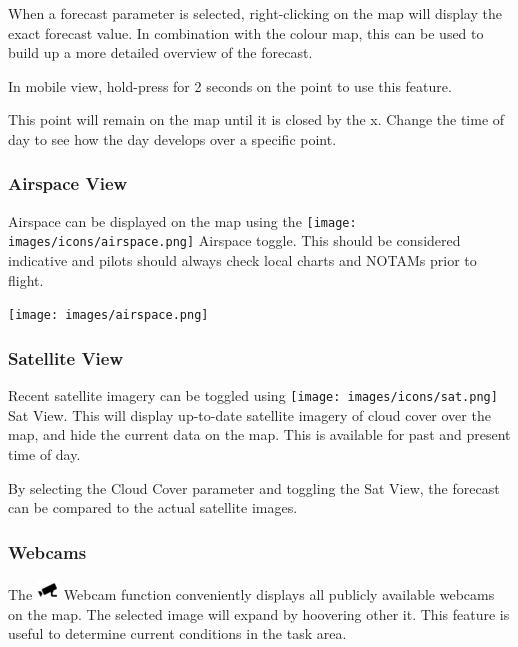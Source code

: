 \documentclass[11pt,a4paper]{article}
\begin{document}
When a forecast parameter is selected, right-clicking on the map will display the exact forecast value. In combination with the colour map, this can be used to build up a more detailed overview of the forecast.

In mobile view, hold-press for 2 seconds on the point to use this feature.

\begin{tip}
\item This point will remain on the map until it is closed by the x. Change the time of day to see how the day develops over a specific point.
\end{tip}

\subsubsection{Airspace View}
Airspace can be displayed on the map using the \texttt{[image: images/icons/airspace.png]} Airspace toggle. This should be considered indicative and pilots should always check local charts and NOTAMs prior to flight.
\begin{center}
\texttt{[image: images/airspace.png]}
\end{center}

\subsubsection{Satellite View}\label{subsec:satview}
Recent satellite imagery can be toggled using \texttt{[image: images/icons/sat.png]} Sat View. This will display up-to-date satellite imagery of cloud cover over the map, and hide the current data on the map. This is available for past and present time of day.

\begin{tip}
\item By selecting the Cloud Cover parameter and toggling the Sat View, the forecast can be compared to the actual satellite images.\end{tip}

\subsubsection{Webcams}\label{subsec:webcams}
The  \includegraphics[height=15pt]{images/icons/webcam.png}  Webcam function conveniently displays all publicly available webcams on the map. The selected image will expand by hoovering other it. This feature is useful to determine current conditions in the task area.
\end{document}
